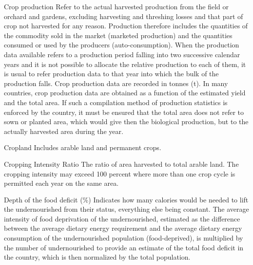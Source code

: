\begin{MetadataCollection} {}
\begin{metadata}{Crop production} {}
Refer to the actual harvested production from the field or orchard and gardens, excluding harvesting and threshing losses and that part of crop not harvested for any reason. Production therefore includes the quantities of the commodity sold in the market (marketed production) and the quantities consumed or used by the producers (auto-consumption). When the production data available refers to a production period falling into two successive calendar years and it is not possible to allocate the relative production to each of them, it is usual to refer production data to that year into which the bulk of the production falls. Crop production data are recorded in tonnes (t). In many countries, crop production data are obtained as a function of the estimated yield and the total area. If such a compilation method of production statistics is enforced by the country, it must be ensured that the total area does not refer to sown or planted area, which would give then the biological production, but to the actually harvested area during the year.
\end{metadata}

\begin{metadata}{Cropland} {}
Includes arable land and permanent crops.
\end{metadata}

\begin{metadata}{Cropping Intensity Ratio} {}
The ratio of area harvested to total arable land. The cropping intensity may exceed 100 percent where more than one crop cycle is permitted each year on the same area.
\end{metadata}

\begin{metadata}{Depth of the food deficit (\%)} {}
Indicates how many calories would be needed to lift the undernourished from their status, everything else being constant. The average intensity of food deprivation of the undernourished, estimated as the difference between the average dietary energy requirement and the average dietary energy consumption of the undernourished population (food-deprived), is multiplied by the number of undernourished to provide an estimate of the total food deficit in the country, which is then normalized by the total population.
\end{metadata}


\end{MetadataCollection}
